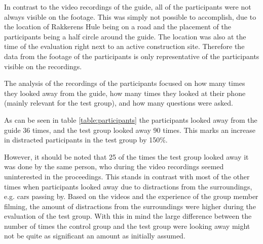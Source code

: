 In contrast to the video recordings of the guide, all of the participants were not always visible on the footage. This was simply not possible to accomplish, due to the location of Rakkerens Hule being on a road and the placement of the participants being a half circle around the guide. The location was also at the time of the evaluation right next to an active construction site. Therefore the data from the footage of the participants is only representative of the participants visible on the recordings. 

The analysis of the recordings of the participants focused on how many times they looked away from the guide, how many times they looked at their phone (mainly relevant for the test group), and how many questions were asked. 

As can be seen in table \ref{table:participants} the participants looked away from the guide 36 times, and the test group looked away 90 times. This marks an increase in distracted participants in the test group by 150\%. 

However, it should be noted that 25 of the times the test group looked away it was done by the same person, who during the video recordings seemed uninterested in the proceedings. This stands in contrast with  most of the other times when participants looked away due to distractions from the surroundings, e.g. cars passing by. Based on the videos and the experience of the group member filming, the amount of distractions from the surroundings were higher during the evaluation of the test group. With this in mind the large difference between the number of times the control group and the test group were looking away might not be quite as significant an amount as initially assumed. 

